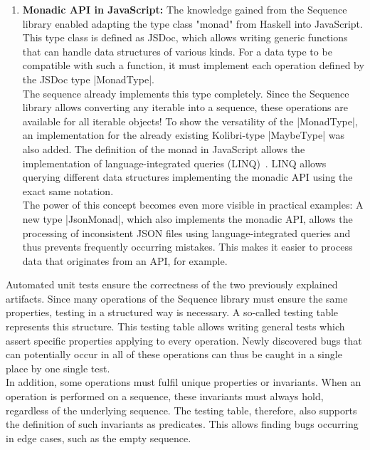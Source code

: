 \begin{enumerate}
\item \textbf{Monadic API in JavaScript:} The knowledge gained from the
  Sequence library enabled adapting the type class "monad" from Haskell into
  JavaScript. This type class is defined as JSDoc, which allows writing generic
  functions that can handle data structures of various kinds. For a data type
  to be compatible with such a function, it must implement each operation
  defined by the JSDoc type |MonadType|. \\ 
  The sequence already implements this type completely. Since the Sequence
  library allows converting any iterable into a sequence, these operations are
  available for all iterable objects! To show the versatility of the
  |MonadType|, an implementation for the already existing Kolibri-type |MaybeType| was
  also added. The definition of the monad in JavaScript allows the
  implementation of language-integrated queries
  (LINQ)~\cite{billwagner_language-integrated_2023}. LINQ allows querying
  different data structures implementing the monadic API using the exact same
  notation. \\ 
  The power of this concept becomes even more visible in practical examples: A
  new type |JsonMonad|, which also implements the monadic API, allows the
  processing of inconsistent JSON files using language-integrated queries and
  thus prevents frequently occurring mistakes. This makes it easier to process
  data that originates from an API, for example.
\end{enumerate}

Automated unit tests ensure the correctness of the two previously explained
artifacts. Since many operations of the Sequence library must ensure the same
properties, testing in a structured way is necessary. A  so-called testing
table represents this structure. This testing table allows writing general
tests which assert specific properties applying to every operation. Newly
discovered bugs that can potentially occur in all of these operations can thus
be caught in a single place by one single test.\\
In addition, some operations must fulfil unique properties or invariants. When
an operation is performed on a sequence, these invariants must always hold,
regardless of the underlying sequence. The testing table, therefore, also
supports the definition of such invariants as predicates. This allows finding
bugs occurring in edge cases, such as the empty sequence.

